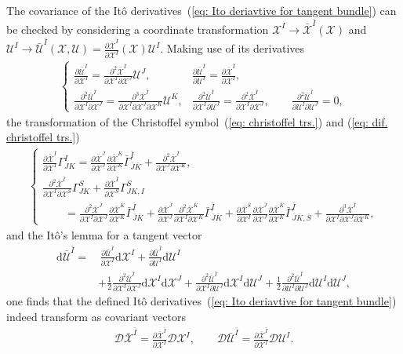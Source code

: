 \documentclass[aps, prd
, preprint
, nofootinbib 
, longbibliography
]{revtex4-1}
\newcommand{\pdif}[2]{\frac{\partial #1}{\partial #2}}
\newcommand{\dd}{\mathrm{d}}
\newcommand{\dps}{\displaystyle}
\newcommand{\calD}{\mathcal{D}}
\newcommand{\calU}{\mathcal{U}}
\newcommand{\calX}{\mathcal{X}}
\newcommand{\bae}[1]{\begin{align} #1 \end{align}}
\newcommand{\bce}[1]{\begin{cases} #1 \end{cases}}
\begin{document}
The covariance of the It\^o derivatives~(\ref{eq: Ito deriavtive for tangent bundle}) can be checked by considering a coordinate transformation $\calX^I\to\bar{\calX}^{\bar{I}}(\calX)$ and $\calU^I\to\bar{\calU}^{\bar{I}}(\calX,\calU)=\pdif{\bar{\calX}^{\bar{I}}}{\calX^I}(\calX)\calU^I$.
Making use of its derivatives
\bae{
    \bce{
        \dps
        \pdif{\bar{\calU}^{\bar{I}}}{\calX^I}=\frac{\partial^2\bar{\calX}^{\bar{I}}}{\partial\calX^I\partial\calX^J}\calU^J, &
        \dps
        \pdif{\bar{\calU}^{\bar{I}}}{\calU^I}=\pdif{\bar{\calX}^{\bar{I}}}{\calX^I}, \\[10pt]
        \dps
        \frac{\partial^2\bar{\calU}^{\bar{I}}}{\partial\calX^I\partial\calX^J}=\frac{\partial^3\bar{\calX}^{\bar{I}}}{\partial\calX^I\partial\calX^J\partial\calX^K}\calU^K, &
        \dps
        \frac{\partial^2\bar{\calU}^{\bar{I}}}{\partial\calX^I\partial\calU^J}=\frac{\partial^2\bar{\calX}^{\bar{I}}}{\partial\calX^I\partial\calX^J}, \qquad \frac{\partial^2\bar{\calU}^{\bar{I}}}{\partial\calU^I\partial\calU^J}=0,
    }
}
the transformation of the Christoffel symbol~(\ref{eq: christoffel trs.}) and (\ref{eq: dif. christoffel trs.})
\bae{
    \bce{
        \dps
        \pdif{\bar{\calX}^{\bar{I}}}{\calX^I}\Gamma^I_{JK}=\pdif{\bar{\calX}^{\bar{J}}}{\calX^J}\pdif{\bar{\calX}^{\bar{K}}}{\calX^K}\bar{\Gamma}^{\bar{I}}_{\bar{J}\bar{K}}+\frac{\partial^2\bar{\calX}^{\bar{I}}}{\partial\calX^J\partial\calX^K}, \\[10pt]
        \dps
        \frac{\partial^2\bar{\calX}^{\bar{I}}}{\partial\calX^I\partial\calX^S}\Gamma^S_{JK}+\pdif{\bar{\calX}^{\bar{I}}}{\calX^S}\Gamma^S_{JK,I} \\[5pt]
        \dps
        \qquad=\frac{\partial^2\bar{\calX}^{\bar{J}}}{\partial\calX^I\partial\calX^J}\pdif{\bar{\calX}^{\bar{K}}}{\calX^K}\bar{\Gamma}^{\bar{I}}_{\bar{J}\bar{K}}+\pdif{\bar{\calX}^{\bar{J}}}{\calX^J}\frac{\partial^2\bar{\calX}^{\bar{K}}}{\partial\calX^I\partial\calX^K}\bar{\Gamma}^{\bar{I}}_{\bar{J}\bar{K}}+\pdif{\bar{\calX}^{\bar{S}}}{\calX^I}\pdif{\bar{\calX}^{\bar{J}}}{\calX^J}\pdif{\bar{\calX}^{\bar{K}}}{\calX^K}\bar{\Gamma}^{\bar{I}}_{\bar{J}\bar{K},\bar{S}}+\frac{\partial^3\bar{\calX}^{\bar{I}}}{\partial\calX^I\partial\calX^J\partial\calX^K},
    }
}
and the It\^o's lemma for a tangent vector
\bae{
    \dd\bar{\calU}^{\bar{I}}=&\,\pdif{\bar{\calU}^{\bar{I}}}{\calX^I}\dd \calX^I+\pdif{\bar{\calU}^{\bar{I}}}{\calU^I}\dd\calU^I \nonumber \\
    &+\frac{1}{2}\frac{\partial^2\bar{\calU}^{\bar{I}}}{\partial\calX^I\partial\calX^J}\dd\calX^I\dd\calX^J+\frac{\partial^2\bar{\calU}^{\bar{I}}}{\partial\calX^I\partial\calU^J}\dd\calX^I\dd\calU^J+\frac{1}{2}\frac{\partial^2\bar{\calU}^{\bar{I}}}{\partial\calU^I\partial\calU^J}\dd\calU^I\dd\calU^J,
}
one finds that the defined It\^o derivatives~(\ref{eq: Ito deriavtive for tangent bundle}) indeed transform as covariant vectors
\bae{
    \calD\bar{\calX}^{\bar{I}}=\pdif{\bar{\calX}^{\bar{I}}}{\calX^I}\calD\calX^I, \qquad \calD\bar{\calU}^{\bar{I}}=\pdif{\bar{\calX}^{\bar{I}}}{\calX^I}\calD\calU^I.
}
\end{document}
